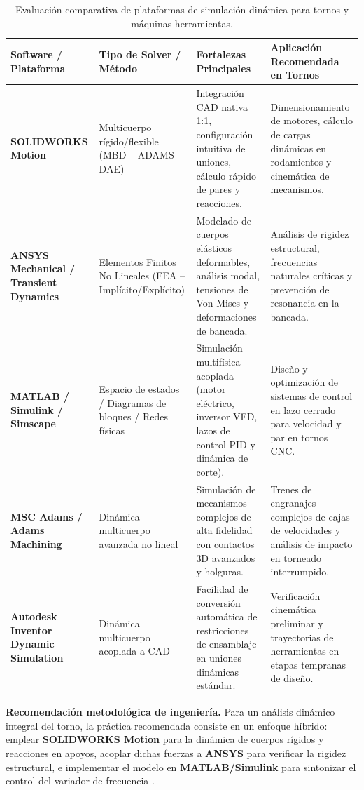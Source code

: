 \documentclass[12pt,a4paper]{article}
\begin{document}
\begingroup
\setlength{\intextsep}{4pt}
\begin{table}[H]
\centering
\footnotesize
\setlength{\tabcolsep}{3.5pt}
\renewcommand{\arraystretch}{0.85}
\captionsetup{skip=3pt}
\caption{Evaluación comparativa de plataformas de simulación dinámica para tornos y máquinas herramientas.}
\label{tab:comparativa_software}
\begin{tabularx}{\textwidth}{p{2.6cm} p{2.8cm} p{3.4cm} X}
\toprule
\textbf{Software / Plataforma} & \textbf{Tipo de Solver / Método} & \textbf{Fortalezas Principales} & \textbf{Aplicación Recomendada en Tornos} \\
\midrule
\textbf{SOLIDWORKS Motion} & Multicuerpo rígido/flexible (MBD -- ADAMS DAE) & Integración CAD nativa 1:1, configuración intuitiva de uniones, cálculo rápido de pares y reacciones. & Dimensionamiento de motores, cálculo de cargas dinámicas en rodamientos y cinemática de mecanismos. \\
\addlinespace[1pt]
\textbf{ANSYS Mechanical / Transient Dynamics} & Elementos Finitos No Lineales (FEA -- Implícito/Explícito) & Modelado de cuerpos elásticos deformables, análisis modal, tensiones de Von Mises y deformaciones de bancada. & Análisis de rigidez estructural, frecuencias naturales críticas y prevención de resonancia en la bancada. \\
\addlinespace[1pt]
\textbf{MATLAB / Simulink / Simscape} & Espacio de estados / Diagramas de bloques / Redes físicas & Simulación multifísica acoplada (motor eléctrico, inversor VFD, lazos de control PID y dinámica de corte). & Diseño y optimización de sistemas de control en lazo cerrado para velocidad y par en tornos CNC. \\
\addlinespace[1pt]
\textbf{MSC Adams / Adams Machining} & Dinámica multicuerpo avanzada no lineal & Simulación de mecanismos complejos de alta fidelidad con contactos 3D avanzados y holguras. & Trenes de engranajes complejos de cajas de velocidades y análisis de impacto en torneado interrumpido. \\
\addlinespace[1pt]
\textbf{Autodesk Inventor Dynamic Simulation} & Dinámica multicuerpo acoplada a CAD & Facilidad de conversión automática de restricciones de ensamblaje en uniones dinámicas estándar. & Verificación cinemática preliminar y trayectorias de herramientas en etapas tempranas de diseño. \\
\bottomrule
\end{tabularx}
\end{table}
\endgroup

\noindent\textbf{Recomendación metodológica de ingeniería.} Para un análisis dinámico integral del torno, la práctica recomendada consiste en un enfoque híbrido: emplear \textbf{SOLIDWORKS Motion} para la dinámica de cuerpos rígidos y reacciones en apoyos, acoplar dichas fuerzas a \textbf{ANSYS} para verificar la rigidez estructural, e implementar el modelo en \textbf{MATLAB/Simulink} para sintonizar el control del variador de frecuencia \cite{dassault2023, shabana2020}.
\end{document}
